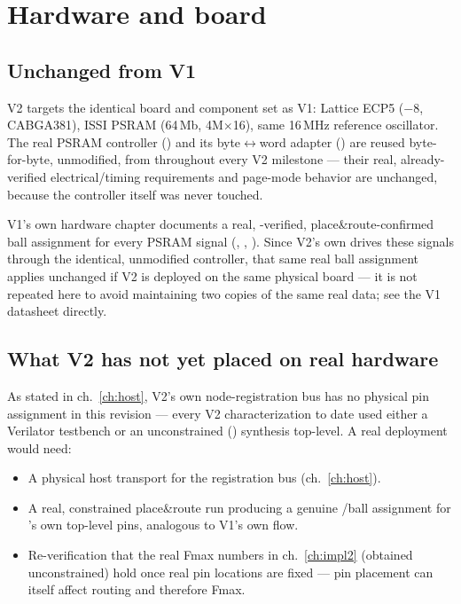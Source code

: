 \chapter{Hardware and board}
\label{ch:hw}

\section{Unchanged from V1}
V2 targets the identical board and component set as V1: Lattice ECP5
 ($-8$, CABGA381), ISSI
 PSRAM (64\,Mb, 4M$\times$16), same 16\,MHz
reference oscillator. The real PSRAM controller
() and its byte$\leftrightarrow$word adapter
() are reused byte-for-byte, unmodified, from
 throughout every V2 milestone --- their real,
already-verified electrical/timing requirements and page-mode behavior
are unchanged, because the controller itself was never touched.

\begin{fnnote}
V1's own hardware chapter documents a real, -verified,
place\&route-confirmed ball assignment for every PSRAM signal
(, , ). Since V2's own 
drives these signals through the identical, unmodified controller, that
same real ball assignment applies unchanged if V2 is deployed on the
same physical board --- it is not repeated here to avoid maintaining two
copies of the same real data; see the V1 datasheet directly.
\end{fnnote}

\section{What V2 has not yet placed on real hardware}
As stated in ch.~\ref{ch:host}, V2's own node-registration bus has no
physical pin assignment in this revision --- every V2 characterization
to date used either a Verilator testbench or an unconstrained
() synthesis top-level. A real deployment
would need:
\begin{itemize}
\item A physical host transport for the registration bus (ch.~\ref{ch:host}).
\item A real, constrained  place\&route run
      producing a genuine /ball assignment for
      's own top-level pins, analogous to
      V1's own  flow.
\item Re-verification that the real Fmax numbers in ch.~\ref{ch:impl2}
      (obtained unconstrained) hold once real pin locations are fixed ---
      pin placement can itself affect routing and therefore Fmax.
\end{itemize}

